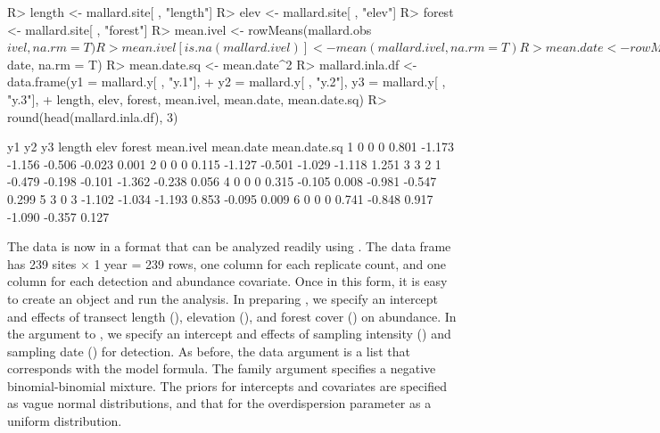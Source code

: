 \documentclass[codesnippet]{jss}
\begin{document}
\begin{CodeInput}
R> length <- mallard.site[ , "length"]
R> elev <- mallard.site[ , "elev"]
R> forest <- mallard.site[ , "forest"]
R> mean.ivel <- rowMeans(mallard.obs$ivel, na.rm = T) 
R> mean.ivel[is.na(mallard.ivel)] <- mean(mallard.ivel, na.rm = T)
R> mean.date <- rowMeans(mallard.obs$date, na.rm = T) 
R> mean.date.sq <- mean.date^2
R> mallard.inla.df <- data.frame(y1 = mallard.y[ , "y.1"], 
+    y2 = mallard.y[ , "y.2"], y3 = mallard.y[ , "y.3"], 
+    length, elev, forest, mean.ivel, mean.date, mean.date.sq)
R> round(head(mallard.inla.df), 3)
\end{CodeInput}
\begin{CodeOutput}
  y1 y2 y3 length   elev forest mean.ivel mean.date mean.date.sq
1  0  0  0  0.801 -1.173 -1.156    -0.506    -0.023        0.001
2  0  0  0  0.115 -1.127 -0.501    -1.029    -1.118        1.251
3  3  2  1 -0.479 -0.198 -0.101    -1.362    -0.238        0.056
4  0  0  0  0.315 -0.105  0.008    -0.981    -0.547        0.299
5  3  0  3 -1.102 -1.034 -1.193     0.853    -0.095        0.009
6  0  0  0  0.741 -0.848  0.917    -1.090    -0.357        0.127
\end{CodeOutput}

The data is now in a format that can be analyzed readily using . The data frame has 239 sites $\times$ 1 year = 239 rows, one column for each replicate count, and one column for each detection and abundance covariate. Once in this form, it is easy to create an  object and run the analysis. In preparing , we specify an intercept and effects of transect length (), elevation (), and forest cover () on abundance. In the  argument to , we specify an intercept and effects of sampling intensity () and sampling date () for detection. As before, the data argument is a list that corresponds with the model formula. The family argument specifies a negative binomial-binomial mixture. The priors for intercepts and covariates are specified as vague normal distributions, and that for the overdispersion parameter as a uniform distribution. 

\end{document}

